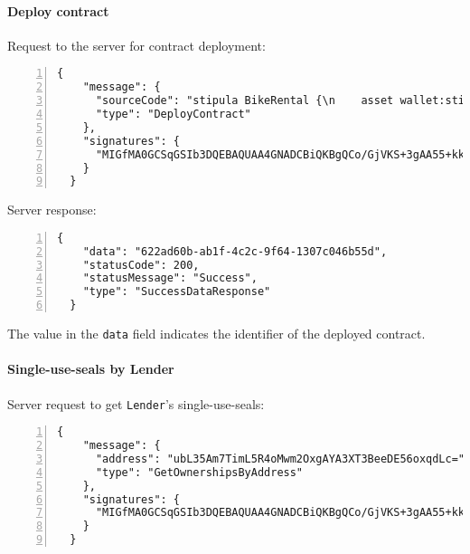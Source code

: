 \paragraph{Deploy contract}

Request to the server for contract deployment:
\begin{Verbatim}[numbers=left,xleftmargin=1cm,firstnumber=1,breaklines=true,breakanywhere=true,tabsize=2]
  {
    "message": {
      "sourceCode": "stipula BikeRental {\n    asset wallet:stipula_coin_asd345\n    field cost, rentingTime, use_code\n    init Inactive\n\n    agreement (Lender, Borrower)(cost, rentingTime){\n        Lender, Borrower: cost, rentingTime\n    } ==> @Inactive\n\n    @Inactive Lender : offer(z)[] {\n        z -> use_code;\n        _\n    } ==> @Proposal\n\n    @Proposal Borrower : accept()[y]\n        (y == cost) {\n            y -o wallet;\n            now + rentingTime >>\n                @Using {\n                    wallet -o Lender\n                } ==> @End\n    } ==> @Using\n\n    @Using Borrower : end()[] {\n        wallet -o Lender;\n        _\n    } ==> @End\n}\n",
      "type": "DeployContract"
    },
    "signatures": {
      "MIGfMA0GCSqGSIb3DQEBAQUAA4GNADCBiQKBgQCo/GjVKS+3gAA55+kko41yINdOcCLQMSBQyuTTkKHE1mhu/TgOpivM0wLPsSga8hQMr3+v3aR0IF/vfCRf6SdiXmWx/jflmEXtnT6fkGcnV6dGNUpHWXSpwUIDt0N88jfnEqekx4S+KDCKg99sGEeHeT65fKS8lB0gjHMt9AOriwIDAQAB": "UTtjlNtPutvql7jAaC0N6HiD1Q+83hborpEvcjvnzbc6lDwwZioGjp2cOKHpC6YXypyqjQZnp1TeagacO9KSZLSZuduBHwiNE20qEgXTCYr0oB1Sww09AQgI23vEoIHf7V0SzLdkfTC6DMxD2nBcMju/4z6xGbXnjfwR+sqxkZE="
    }
  }
\end{Verbatim}

Server response:
\begin{Verbatim}[numbers=left,xleftmargin=1cm,firstnumber=1,breaklines=true,breakanywhere=true,tabsize=2]
  {
    "data": "622ad60b-ab1f-4c2c-9f64-1307c046b55d",
    "statusCode": 200,
    "statusMessage": "Success",
    "type": "SuccessDataResponse"
  }
\end{Verbatim}

The value in the \verb|data| field indicates the identifier of the deployed contract.

\paragraph{Single-use-seals by Lender}

Server request to get \verb|Lender|'s single-use-seals:
\begin{Verbatim}[numbers=left,xleftmargin=1cm,firstnumber=1,breaklines=true,breakanywhere=true,tabsize=2]
  {
    "message": {
      "address": "ubL35Am7TimL5R4oMwm2OxgAYA3XT3BeeDE56oxqdLc=",
      "type": "GetOwnershipsByAddress"
    },
    "signatures": {
      "MIGfMA0GCSqGSIb3DQEBAQUAA4GNADCBiQKBgQCo/GjVKS+3gAA55+kko41yINdOcCLQMSBQyuTTkKHE1mhu/TgOpivM0wLPsSga8hQMr3+v3aR0IF/vfCRf6SdiXmWx/jflmEXtnT6fkGcnV6dGNUpHWXSpwUIDt0N88jfnEqekx4S+KDCKg99sGEeHeT65fKS8lB0gjHMt9AOriwIDAQAB": "MomZTc63z7PfH35c1dL4tjXebcsW+0Zxl0nP1NQdcUFws98DX+bMWI7L0C6IO5lxvkYve4zdio1Crn97FXvngK4aVfiEZEnHOJ0tstq7uQYGErM3DDAABqPq8HH5yoKnLST2LWpO0oD8G/VXvIE6qMT5D34W1Ci0q4uh+7y3EcY="
    }
  }
\end{Verbatim}

